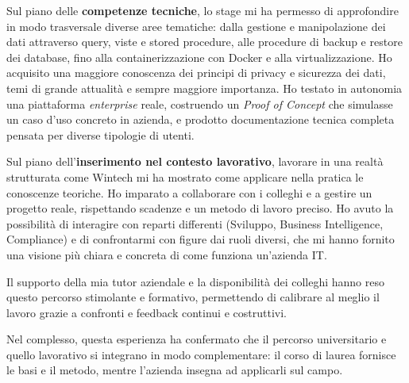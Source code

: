 Sul piano delle \textbf{competenze tecniche}, lo stage mi ha permesso di approfondire in modo trasversale diverse aree tematiche: dalla gestione e manipolazione dei dati 
attraverso query, viste e stored procedure, alle procedure di backup e restore dei database, fino alla containerizzazione con Docker e alla virtualizzazione. 
Ho acquisito una maggiore conoscenza dei principi di privacy e sicurezza dei dati, temi di grande attualità e sempre maggiore importanza. 
Ho testato in autonomia una piattaforma \emph{enterprise} reale, costruendo un \emph{Proof of Concept} che simulasse un caso d'uso concreto in azienda, 
e prodotto documentazione tecnica completa pensata per diverse tipologie di utenti.

Sul piano dell'\textbf{inserimento nel contesto lavorativo}, lavorare in una realtà strutturata come Wintech mi ha mostrato come applicare nella pratica le conoscenze teoriche. 
Ho imparato a collaborare con i colleghi e a gestire un progetto reale, rispettando scadenze e un metodo di lavoro preciso.
Ho avuto la possibilità di interagire con reparti differenti (Sviluppo, Business Intelligence, Compliance) e di confrontarmi con figure dai ruoli diversi, 
che mi hanno fornito una visione più chiara e concreta di come funziona un'azienda IT.

Il supporto della mia tutor aziendale e la disponibilità dei colleghi hanno reso questo percorso stimolante e formativo, permettendo di calibrare al meglio il lavoro 
grazie a confronti e feedback continui e costruttivi.

Nel complesso, questa esperienza ha confermato che il percorso universitario e quello lavorativo si integrano in modo complementare: il corso di laurea fornisce le basi e 
il metodo, mentre l'azienda insegna ad applicarli sul campo.